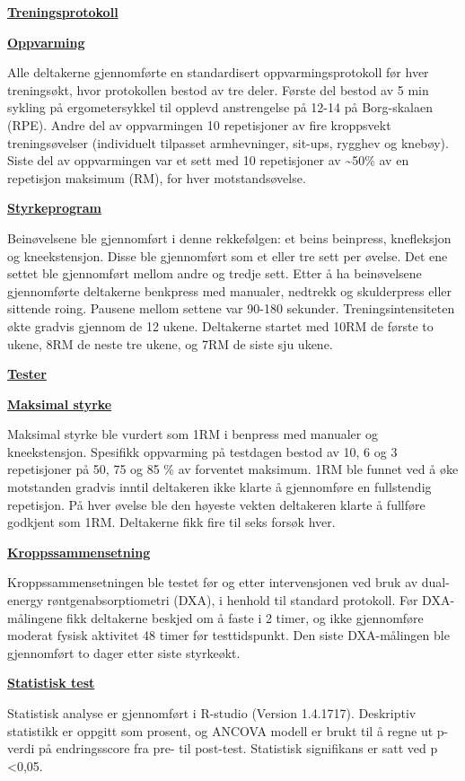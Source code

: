\documentclass[
]{book}
\begin{document}
\underline{\textbf{Treningsprotokoll}}

\underline{\textbf{Oppvarming}}

Alle deltakerne gjennomførte en standardisert oppvarmingsprotokoll før hver treningsøkt, hvor protokollen bestod av tre deler. Første del bestod av 5 min sykling på ergometersykkel til opplevd anstrengelse på 12-14 på Borg-skalaen (RPE). Andre del av oppvarmingen 10 repetisjoner av fire kroppsvekt treningsøvelser (individuelt tilpasset armhevninger, sit-ups, rygghev og knebøy). Siste del av oppvarmingen var et sett med 10 repetisjoner av \textasciitilde50\% av en repetisjon maksimum (RM), for hver motstandsøvelse.

\underline{\textbf{Styrkeprogram}}

Beinøvelsene ble gjennomført i denne rekkefølgen: et beins beinpress, knefleksjon og kneekstensjon. Disse ble gjennomført som et eller tre sett per øvelse. Det ene settet ble gjennomført mellom andre og tredje sett. Etter å ha beinøvelsene gjennomførte deltakerne benkpress med manualer, nedtrekk og skulderpress eller sittende roing. Pausene mellom settene var 90-180 sekunder. Treningsintensiteten økte gradvis gjennom de 12 ukene. Deltakerne startet med 10RM de første to ukene, 8RM de neste tre ukene, og 7RM de siste sju ukene.

\underline{\textbf{Tester}}

\underline{\textbf{Maksimal styrke}}

Maksimal styrke ble vurdert som 1RM i benpress med manualer og kneekstensjon. Spesifikk oppvarming på testdagen bestod av 10, 6 og 3 repetisjoner på 50, 75 og 85 \% av forventet maksimum. 1RM ble funnet ved å øke motstanden gradvis inntil deltakeren ikke klarte å gjennomføre en fullstendig repetisjon. På hver øvelse ble den høyeste vekten deltakeren klarte å fullføre godkjent som 1RM. Deltakerne fikk fire til seks forsøk hver.

\underline{\textbf{Kroppssammensetning}}

Kroppssammensetningen ble testet før og etter intervensjonen ved bruk av dual-energy røntgenabsorptiometri (DXA), i henhold til standard protokoll. Før DXA-målingene fikk deltakerne beskjed om å faste i 2 timer, og ikke gjennomføre moderat fysisk aktivitet 48 timer før testtidspunkt. Den siste DXA-målingen ble gjennomført to dager etter siste styrkeøkt.

\underline{\textbf{Statistisk test}}

Statistisk analyse er gjennomført i R-studio (Version 1.4.1717). Deskriptiv statistikk er oppgitt som prosent, og ANCOVA modell er brukt til å regne ut p-verdi på endringsscore fra pre- til post-test. Statistisk signifikans er satt ved p \textless0,05.
\end{document}
